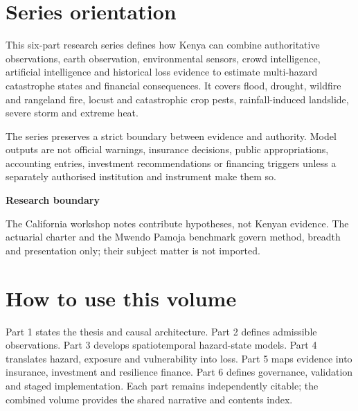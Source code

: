 
\frontmatter
\chapter*{Series orientation}

This six-part research series defines how Kenya can combine authoritative observations, earth observation, environmental sensors, crowd intelligence, artificial intelligence and historical loss evidence to estimate multi-hazard catastrophe states and financial consequences. It covers flood, drought, wildfire and rangeland fire, locust and catastrophic crop pests, rainfall-induced landslide, severe storm and extreme heat.

The series preserves a strict boundary between evidence and authority. Model outputs are not official warnings, insurance decisions, public appropriations, accounting entries, investment recommendations or financing triggers unless a separately authorised institution and instrument make them so.

\begin{center}
\vspace{6mm}
\colorbox{SeriesPale}{\parbox{0.88\textwidth}{\centering\sffamily\color{SeriesNavy}
\textbf{Research boundary}\par
The California workshop notes contribute hypotheses, not Kenyan evidence. The actuarial charter and the Mwendo Pamoja benchmark govern method, breadth and presentation only; their subject matter is not imported.}}
\end{center}

\vspace{6mm}
\chapter*{How to use this volume}

Part 1 states the thesis and causal architecture. Part 2 defines admissible observations. Part 3 develops spatiotemporal hazard-state models. Part 4 translates hazard, exposure and vulnerability into loss. Part 5 maps evidence into insurance, investment and resilience finance. Part 6 defines governance, validation and staged implementation. Each part remains independently citable; the combined volume provides the shared narrative and contents index.
